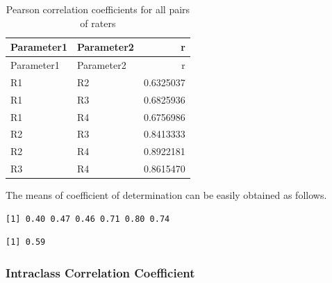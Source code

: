 \documentclass[
  letterpaper,
  DIV=11,
  numbers=noendperiod]{scrreprt}
\newenvironment{Shaded}{\begin{snugshade}}{\end{snugshade}}
\newcommand{\CommentTok}[1]{\textcolor[rgb]{0.37,0.37,0.37}{#1}}
\newcommand{\DecValTok}[1]{\textcolor[rgb]{0.68,0.00,0.00}{#1}}
\newcommand{\FunctionTok}[1]{\textcolor[rgb]{0.28,0.35,0.67}{#1}}
\newcommand{\NormalTok}[1]{\textcolor[rgb]{0.00,0.23,0.31}{#1}}
\newcommand{\SpecialCharTok}[1]{\textcolor[rgb]{0.37,0.37,0.37}{#1}}
\begin{document}
\hypertarget{tbl-correl}{}
\begin{longtable}[]{@{}llr@{}}
\caption{\label{tbl-correl}Pearson correlation coefficients for all
pairs of raters}\tabularnewline
\toprule()
Parameter1 & Parameter2 & r \\
\midrule()
\endfirsthead
\toprule()
Parameter1 & Parameter2 & r \\
\midrule()
\endhead
R1 & R2 & 0.6325037 \\
R1 & R3 & 0.6825936 \\
R1 & R4 & 0.6756986 \\
R2 & R3 & 0.8413333 \\
R2 & R4 & 0.8922181 \\
R3 & R4 & 0.8615470 \\
\bottomrule()
\end{longtable}

The means of coefficient of determination can be easily obtained as
follows.

\begin{Shaded}
\end{Shaded}

\begin{verbatim}
[1] 0.40 0.47 0.46 0.71 0.80 0.74
\end{verbatim}

\begin{Shaded}
\end{Shaded}

\begin{verbatim}
[1] 0.59
\end{verbatim}

\hypertarget{intraclass-correlation-coefficient}{%
\subsubsection{Intraclass Correlation
Coefficient}\label{intraclass-correlation-coefficient}}
\end{document}
